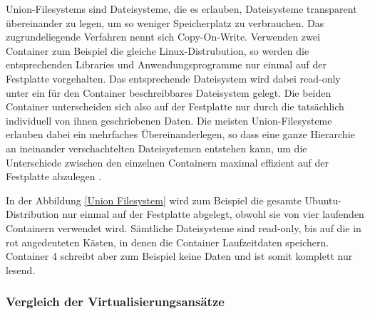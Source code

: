 Union-Filesystems sind Dateisysteme, die es erlauben, Dateisysteme transparent übereinander zu legen, um so weniger Speicherplatz zu verbrauchen. Das zugrundeliegende Verfahren nennt sich Copy-On-Write. Verwenden zwei Container zum Beispiel die gleiche Linux-Distrubution, so werden die entsprechenden Libraries und Anwendungsprogramme nur einmal auf der Festplatte vorgehalten. Das entsprechende Dateisystem wird dabei read-only unter ein für den Container beschreibbares Dateisystem gelegt. Die beiden Container unterscheiden sich also auf der Festplatte nur durch die tatsächlich individuell von ihnen geschriebenen Daten. Die meisten Union-Filesysteme erlauben dabei ein mehrfaches Übereinanderlegen, so dass eine ganze Hierarchie an ineinander verschachtelten Dateisystemen entstehen kann, um die Unterschiede zwischen den einzelnen Containern maximal effizient auf der Festplatte abzulegen \citep[Vgl.][S. 3]{Schee14}.

In der Abbildung \ref{Union Filesystem} wird zum Beispiel die gesamte Ubuntu-Distribution nur einmal auf der Festplatte abgelegt, obwohl sie von vier laufenden Containern verwendet wird. Sämtliche Dateisysteme sind read-only, bis auf die in rot angedeuteten Kästen, in denen die Container Laufzeitdaten speichern. Container 4 schreibt aber zum Beispiel keine Daten und ist somit komplett nur lesend.

\subsubsection{Vergleich der Virtualisierungsansätze}

